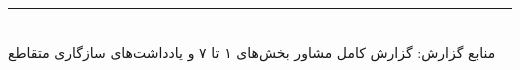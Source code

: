 \documentclass[12pt, a4paper]{article}
\newcommand{\dash}{\lr{---}}
\begin{document}
\vspace{0.6cm}

\vspace{1.5cm}
\begin{center}
{\color{seriesblue}\rule{0.45\linewidth}{0.4pt}}\\[8pt]
{\small\color{sectiongray}
منابع گزارش: گزارش کامل مشاور \dash{} بخش‌های ۱ تا ۷ و يادداشت‌های سازگاری متقاطع
}
\end{center}
\end{document}
